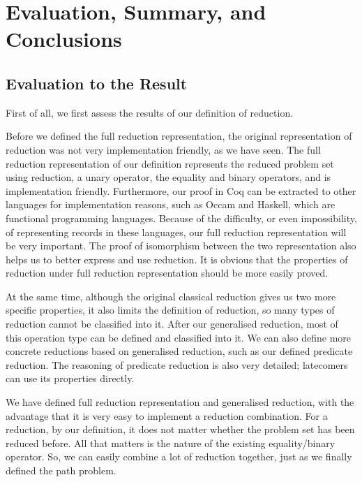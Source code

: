 \documentclass[a4paper,12pt,twoside,openright]{report}
\begin{document}
\chapter{Evaluation, Summary, and Conclusions} 


%

\section{Evaluation to the Result}
First of all, we first assess the results of our definition of reduction. 

Before we defined the full reduction representation, the original representation of reduction was not very implementation friendly, as we have seen. The full reduction representation of our definition represents the reduced problem set using reduction, a unary operator, the equality and binary operators, and is implementation friendly. Furthermore, our proof in Coq can be extracted to other languages for implementation reasons, such as Occam and Haskell, which are functional programming languages.  Because of the difficulty, or even impossibility, of representing records in these languages, our full reduction representation will be very important. The proof of isomorphism between the two representation also helps us to better express and use reduction. It is obvious that the properties of reduction under full reduction representation should be more easily proved.

At the same time, although the original classical reduction gives us two more specific properties, it also limits the definition of reduction, so many types of reduction cannot be classified into it. After our generalised reduction, most of this operation type can be defined and classified into it. We can also define more concrete reductions based on generalised reduction, such as our defined predicate reduction. The reasoning of predicate reduction is also very detailed; latecomers can use its properties directly.

We have defined full reduction representation and generalised reduction, with the advantage that it is very easy to implement a reduction combination. For a reduction, by our definition, it does not matter whether the problem set has been reduced before. All that matters is the nature of the existing equality/binary operator. So, we can easily combine a lot of reduction together, just as we finally defined the path problem.
\end{document}
